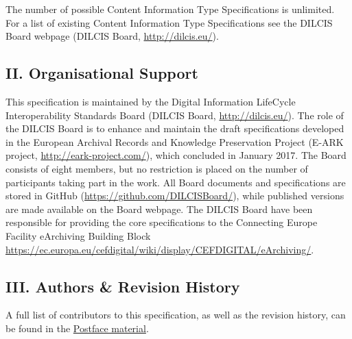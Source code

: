 The number of possible Content Information Type Specifications is
unlimited. For a list of existing Content Information Type
Specifications see the DILCIS Board webpage (DILCIS Board,
\href{http://dilcis.eu/}{http://dilcis.eu/}).

\hypertarget{ii-organisational-support}{%
\subsection*{II. Organisational
Support}\label{ii-organisational-support}}

This specification is maintained by the Digital Information LifeCycle
Interoperability Standards Board (DILCIS Board,
\href{http://dilcis.eu/}{http://dilcis.eu/}). The role of the DILCIS
Board is to enhance and maintain the draft specifications developed in
the European Archival Records and Knowledge Preservation Project (E-ARK
project, \href{http://eark-project.com/}{http://eark-project.com/}),
which concluded in January 2017. The Board consists of eight members,
but no restriction is placed on the number of participants taking part
in the work. All Board documents and specifications are stored in GitHub
(\href{https://github.com/DILCISBoard/}{https://github.com/DILCISBoard/}),
while published versions are made available on the Board webpage. The
DILCIS Board have been responsible for providing the core specifications
to the Connecting Europe Facility eArchiving Building Block
\href{https://ec.europa.eu/cefdigital/wiki/display/CEFDIGITAL/eArchiving/}{https://ec.europa.eu/cefdigital/wiki/display/CEFDIGITAL/eArchiving/}.

\hypertarget{iii-authors--revision-history}{%
\subsection*{III. Authors \& Revision
History}\label{iii-authors--revision-history}}

A full list of contributors to this specification, as well as the
revision history, can be found in the
\protect\hyperlink{postface}{Postface material}.
